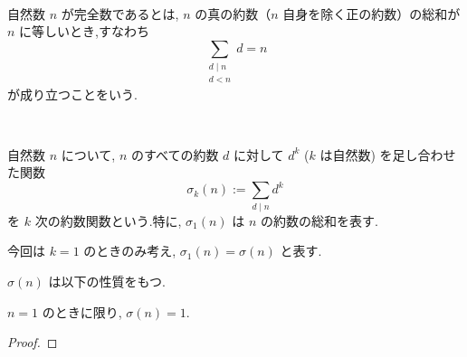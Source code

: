%

\begin{definition}[完全数]\label{perfect}\leanok~\

自然数 \(n\) が完全数であるとは, \(n\) の真の約数（\(n\) 自身を除く正の約数）の総和が \(n\) に等しいとき,すなわち
\[
\sum_{\substack{d \mid n\\ d < n}} d = n
\]
\;\;\;が成り立つことをいう.

\end{definition}


\begin{definition}[約数関数]\label{Arithmetic_Function}\leanok~\

自然数 \(n\) について, \(n\) のすべての約数 \(d\) に対して \(d^k\) (\(k\) は自然数) を足し合わせた関数
\[
\sigma_k(n) := \sum_{d \mid n} d^k
\]
\;\;\;を \(k\) 次の約数関数という.特に, \(\sigma_1(n)\) は \(n\) の約数の総和を表す.

\end{definition}

\vspace{0.5\baselineskip}

今回は \(k = 1\) のときのみ考え, \(\sigma_1(n) = \sigma(n)\) と表す.

\vspace{0.5\baselineskip}

\(\sigma(n)\) は以下の性質をもつ.

\begin{lemma}

\(n = 1\) のときに限り, \(\sigma(n) = 1\).

\end{lemma}

\begin{proof}

\end{proof}

